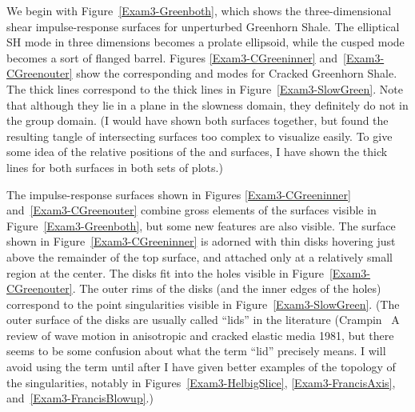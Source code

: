 We begin with Figure~\ref{Exam3-Greenboth}, which shows
the three-dimensional shear impulse-response surfaces for unperturbed
Greenhorn Shale.
The elliptical SH mode in three dimensions becomes a prolate ellipsoid,
while the cusped {\qSV} mode becomes a sort of flanged barrel.
Figures \ref{Exam3-CGreeninner} and~\ref{Exam3-CGreenouter} show the
corresponding {} and {} modes for Cracked Greenhorn Shale.
The thick lines correspond to the thick lines in Figure~\ref{Exam3-SlowGreen}.
Note that although they lie in a plane in the slowness domain,
they definitely do not in the group domain.
(I would have shown both surfaces together,
but found the resulting tangle of
intersecting surfaces too complex to visualize easily.
To give some idea of the relative positions of the {} and {}
surfaces, I have shown the thick lines for both surfaces
in both sets of plots.)

The impulse-response surfaces shown in Figures
\ref{Exam3-CGreeninner} and~\ref{Exam3-CGreenouter}
combine gross elements of the surfaces visible
in Figure~\ref{Exam3-Greenboth}, but some new features are also visible.
The surface shown in Figure~\ref{Exam3-CGreeninner} is adorned with
thin disks hovering just above the remainder of the top surface,
and attached only at a relatively small region at the center.
The disks fit into the holes visible in Figure~\ref{Exam3-CGreenouter}.
The outer rims of the disks (and the inner edges of the holes)
correspond to the point
singularities visible in Figure~\ref{Exam3-SlowGreen}.
(The outer surface of the disks are usually called ``lids'' in the literature
(Crampin~
{A review of wave motion in anisotropic and cracked elastic media}
{1981}, but there seems to be some confusion about what the term ``lid''
precisely means. I will avoid using the term until after I have
given better examples of the topology of the singularities, notably in
Figures~\ref{Exam3-HelbigSlice}, \ref{Exam3-FrancisAxis},
and~\ref{Exam3-FrancisBlowup}.)

